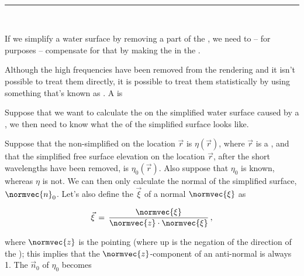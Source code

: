 \ 

\hrule

\ 

If we simplify a water surface by removing a part of the , we need to -- for \rendering purposes -- compensate for that by making the  in the  .

Although the high frequencies have been removed from the rendering and it isn't possible to treat them directly, it is possible to treat them statistically by using something that's known as \microfacets. A \microfacet is 


Suppose that we want to calculate the \shading on the simplified water surface caused by a , we then need to know what the  of the simplified surface looks like.

Suppose that the non-simplified  on the location $\vec{r}$ is $\eta(\vec{r})$, where $\vec{r}$ is a , and that the simplified free surface elevation on the location $\vec{r}$, after the short wavelengths have been removed, is $\eta_0(\vec{r})$. Also suppose that $\eta_0$ is known, whereas $\eta$ is not. We can then only calculate the normal of the simplified surface, $\normvec{n}_0$. Let's also define the  $\vec{\xi}$ of a normal $\normvec{\xi}$ as

\begin{equation}
\vec{\xi} \,=\, \frac{\normvec{\xi}}{\normvec{z}\cdot\normvec{\xi}}\,,
\end{equation}

where $\normvec{z}$ is the  pointing \up (where up is the negation of the direction of the ); this implies that the $\normvec{z}$-component of an anti-normal is always 1. The  $\vec{n}_0$ of $\eta_0$ becomes

